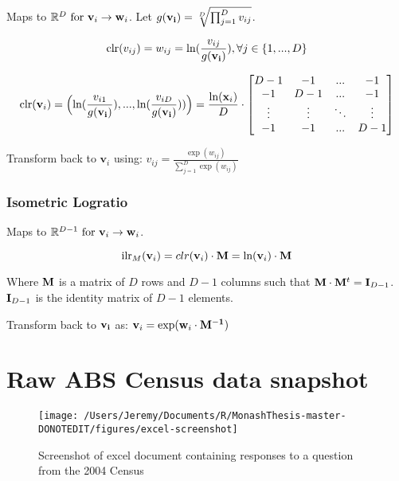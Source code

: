 \documentclass{monashthesis}
\theoremstyle{definition}
\theoremstyle{definition}
\theoremstyle{definition}
\theoremstyle{remark}
\begin{document}
Maps to \(\mathbb{R}^{D} \text{ for } {\bf v}_i \to {\bf w}_i\). Let
\(g({\bf v_i}) = \sqrt[D]{\prod_{j=1}^D v_{ij}}\).

\[\text{clr}(v_{ij}) = w_{ij} = \text{ln}(\frac{v_{ij}}{g({\bf v_i})}), \forall \space j \in \{1,...,D\}\]

\[\text{clr}({\bf v}_i) = \Big(\text{ln}(\frac{v_{i1}}{g({\bf v_i})}),...,\text{ln}(\frac{v_{iD}}{g({\bf v_i})}))\Big) \\ = \frac{\text{ln}({\bf x}_i)}{D} \cdot \begin{bmatrix}
    D-1 & -1 & ... & -1 \\
    -1 & D-1 & ... & -1 \\
    \vdots & \vdots & \ddots & \vdots \\
    -1 & -1 & ... & D-1
\end{bmatrix}\]

Transform back to \(\textbf{v}_i\) using:
\(v_{ij} = \frac{\exp(w_{ij})}{\sum_{j=1}^D \exp(w_{ij})}\)

\subsection{Isometric Logratio}\label{isometric-logratio}

Maps to \(\mathbb{R}^{D-1} \text{ for } {\bf v}_i \to {\bf w}_i\).

\[\text{ilr}_M({\bf v}_i) = clr({\bf v}_i)\cdot{\bf M} = \text{ln}({\bf v}_i) \cdot {\bf M}\]

Where \(\bf M\) is a matrix of \(D\) rows and \(D-1\) columns such that
\({\bf M} \cdot {\bf M}^t = {\bf I}_{D-1}\). \({\bf I}_{D-1}\) is the
identity matrix of \(D-1\) elements.

Transform back to \(\bf{v}_i\) as:
\({\bf v}_i = \exp({\bf w}_i \space \cdot \space {\bf M^{-1}})\)

\chapter{Raw ABS Census data
snapshot}\label{raw-abs-census-data-snapshot}

\begin{figure}

\texttt{[image: /Users/Jeremy/Documents/R/MonashThesis-master-DONOTEDIT/figures/excel-screenshot]} \hfill{}

\caption{Screenshot of excel document containing responses to a question from the 2004 Census}\label{fig:excel-demo}
\end{figure}

\printbibliography[heading=bibintoc]
\end{document}
